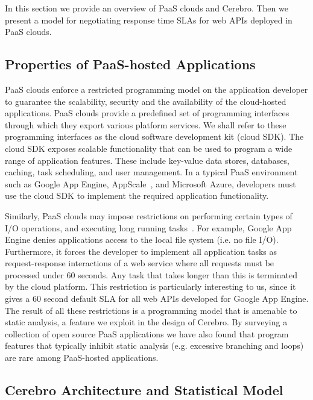 In this section we provide an overview of PaaS clouds and Cerebro. Then we present a model for 
negotiating response time SLAs for web APIs deployed in PaaS clouds.

\vspace{-0.1in}
\subsection{ Properties of PaaS-hosted Applications}
\vspace{-0.1in}
PaaS clouds enforce a restricted programming model on the application developer to guarantee
the scalability, security and the availability of the cloud-hosted applications. 
PaaS clouds provide a predefined set of programming interfaces through which they export 
various platform services. We shall refer to these programming interfaces as the cloud software
development kit (cloud SDK). The cloud SDK exposes scalable functionality that can be used to 
program a wide range of application features. These include key-value data stores, databases, 
caching, task scheduling, and user management. In a typical PaaS environment
such as Google App Engine, AppScale~\cite{6488671}, and Microsoft Azure, 
developers must use the cloud SDK to implement the required application functionality.

Similarly, PaaS clouds may impose restrictions on performing
certain types of I/O operations, and executing long running tasks~\cite{gae-limits,azure-limits,gae-sandbox}. 
For example, Google App Engine
denies applications access to the local file system (i.e. no file I/O). Furthermore, it forces the
developer to implement all application tasks as request-response interactions of a web service
where all requests must be processed
under 60 seconds. Any task that takes longer than this is terminated by the cloud platform.
This restriction is particularly interesting to us, since it gives a 60 second default SLA
for all web APIs developed for Google App Engine.
The result of all these restrictions is a programming model that is
amenable to static analysis, a feature we exploit in the design of Cerebro. By surveying
a collection of open source PaaS applications we have also found that program features that typically
inhibit static analysis (e.g. excessive branching and loops) are rare among PaaS-hosted
applications.

\vspace{-0.1in}
\subsection{ Cerebro Architecture and Statistical Model}
\vspace{-0.1in}

